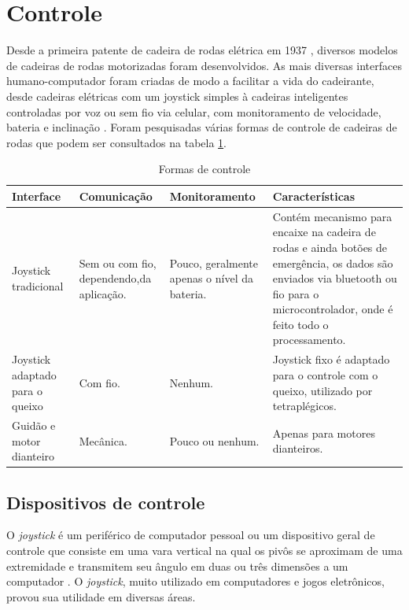 \section{Controle}

Desde a primeira patente de cadeira de rodas elétrica em 1937 \cite{patent_cadeira_rodas_eletrica}, diversos modelos de cadeiras de rodas motorizadas foram desenvolvidos. As mais diversas interfaces humano-computador foram criadas de modo a facilitar a vida do cadeirante, desde cadeiras elétricas com um joystick simples à cadeiras inteligentes controladas por voz ou sem fio via celular, com monitoramento de velocidade, bateria e inclinação \cite{artigo_controle_cadeira_eletrica}. Foram pesquisadas várias formas de controle de cadeiras de rodas que podem ser consultados na tabela \ref{tab:formas_controle}.

\begin{table}[!ht]
	\centering
	\begin{tabular}{p{2.5cm}|p{3cm}|p{3cm}|p{5cm}}
		\hline
		Interface & Comunicação & Monitoramento & Características \\ \hline
		Joystick tradicional & Sem ou com fio, dependendo,da aplicação. & Pouco, geralmente apenas o nível da bateria. & Contém mecanismo para encaixe na cadeira de rodas e ainda botões de emergência, os dados são enviados via bluetooth ou fio para o microcontrolador, onde é feito todo o processamento. \\ \hline
		Joystick adaptado para o queixo & Com fio. & Nenhum. & Joystick fixo é adaptado para o controle com o queixo, utilizado por tetraplégicos. \\ \hline
		Guidão e motor dianteiro & Mecânica. & Pouco ou nenhum. & Apenas para motores dianteiros. \\ \hline
	\end{tabular}
	\caption{Formas de controle}
	\label{tab:formas_controle}
\end{table}

\subsection{Dispositivos de controle}

O \textit{joystick} é um periférico de computador pessoal ou um dispositivo geral de controle que consiste em uma vara vertical na qual os pivôs se aproximam de uma extremidade e transmitem seu ângulo em duas ou três dimensões a um computador \cite{livro_creating_games}. O \textit{joystick}, muito utilizado em computadores e jogos eletrônicos, provou sua utilidade em diversas áreas.

